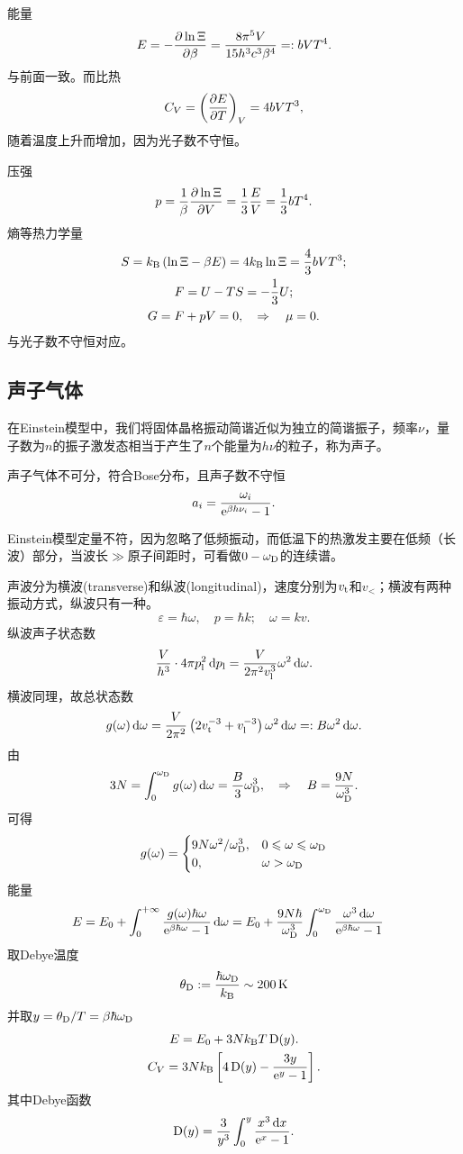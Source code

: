 能量
\[
	E=-\frac{\partial^{\;\!\!}\ln\Xi}{\partial \beta^{\;\!\!}}=\frac{8\pi^5V}{15h^3c^3\beta^4}=:bVT^4.
\]
与前面一致。而比热
\[
	C_V=\left(\frac{\partial^{\;\!\!}E}{\partial T^{\;\!\!}}\right)_V=4bVT^3,
\]
随着温度上升而增加，因为光子数不守恒。

压强
\[
	p=\frac1\beta\frac{\partial^{\;\!\!}\ln\Xi}{\partial V^{\;\!\!}}=\frac13\frac EV=\frac13bT^4.
\]
熵等热力学量
\begin{gather*}
	S=k_{\mathrm B}\left(\ln\Xi-\beta E\right)=4k_{\mathrm B}\ln\Xi=\frac43bVT^3;\\
	F=U-TS=-\frac13U;\\
	G=F+pV=0,\quad\Rightarrow\quad\mu=0.
\end{gather*}
与光子数不守恒对应。
\subsection{声子气体}
在Einstein模型中，我们将固体晶格振动简谐近似为独立的简谐振子，频率$\nu$，量子数为$n$的振子激发态相当于产生了$n$个能量为$h\nu$的粒子，称为声子。

声子气体不可分，符合Bose分布，且声子数不守恒
\[
	a_i=\frac{\omega_i}{\mathop{}\!\mathrm{e}^{\beta h\nu_i}-1}.
\]

Einstein模型定量不符，因为忽略了低频振动，而低温下的热激发主要在低频（长波）部分，当波长$\gg$原子间距时，可看做$0-\omega_\mathrm D$的连续谱。


声波分为横波(transverse)和纵波(longitudinal)，速度分别为$v_\mathrm t$和$v_\lt$；横波有两种振动方式，纵波只有一种。
\[
	\varepsilon=\hbar\omega,\quad p=\hbar k;\quad \omega=kv.
\]
纵波声子状态数
\[
	\frac V{h^3}\cdot 4\pi p_\mathrm l^2\mathop{}\!\mathrm{d} p_\mathrm l=\frac V{2\pi^2v_\mathrm l^3}\omega^2\mathop{}\!\mathrm{d}\omega.
\]
横波同理，故总状态数
\[
	g(\omega)\mathop{}\!\mathrm{d}\omega=\frac V{2\pi^2}\left(2v_\mathrm t^{-3}+v_\mathrm l^{-3}\right)\omega^2\mathop{}\!\mathrm{d}\omega=:B\omega^2\mathop{}\!\mathrm{d}\omega.
\]
由
\[
	3	N=\int_0^{\omega_\mathrm D}g(\omega)\mathop{}\!\mathrm{d}\omega=\frac B3\omega_\mathrm D^3,\quad\Rightarrow\quad B=\frac{9N}{\omega_\mathrm D^3}.
\]
可得
\begin{align*}
	g(\omega)=\begin{cases}
		9N\omega^2/\omega_\mathrm D^3,&0\leqslant\omega\leqslant\omega_\mathrm D\\
		0,&\omega>\omega_\mathrm D
	\end{cases}
\end{align*}
能量 
\begin{align*}
	E&=E_0+\int_0^{+\infty}\frac{ g(\omega)\hbar\omega}{\mathop{}\!\mathrm{e}^{\beta\hbar\omega}-1}\mathop{}\!\mathrm{d}\omega=E_0+\frac{9N\hbar}{\omega_\mathrm D^3}\int_0^{\omega_\mathrm D}\frac{\omega^3\mathop{}\!\mathrm{d}\omega}{\mathop{}\!\mathrm{e}^{\beta\hbar\omega}-1}
\end{align*}
取Debye温度
\[
	\theta_\Db:=\frac{\hbar\omega_\Db}\kB\sim\SI{200}\K
\]
并取$y=\theta_\mathrm D/T=\beta\hbar\omega_\mathrm D$
\begin{gather}
	E=E_0+3Nk_{\mathrm B} T\operatorname{D}(y).\\
	C_V=3Nk_{\mathrm B}\left[4\operatorname{D}(y)-\frac{3y}{\mathop{}\!\mathrm{e}^{y}-1}\right].
\end{gather}
其中Debye函数
\[
	\operatorname{D}(y)=\frac 3{y^3}\int_0^{y}\frac{x^3\mathop{}\!\mathrm{d} x}{\mathop{}\!\mathrm{e}^ x-1}.
\]

